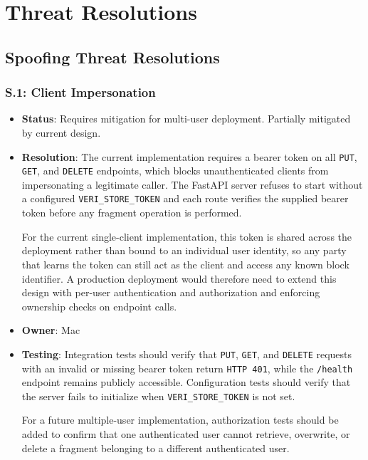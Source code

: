 \documentclass[../veristore_security_model.tex]{subfiles}
\begin{document}
\section{Threat Resolutions}


\subsection{Spoofing Threat Resolutions}

\subsubsection{S.1: Client Impersonation}
\begin{itemize}
    \item \textbf{Status}: Requires mitigation for multi-user deployment. Partially mitigated by current design.
    \item \textbf{Resolution}: The current implementation requires a bearer token on all \texttt{PUT}, \texttt{GET}, and \texttt{DELETE} endpoints, which blocks unauthenticated clients from impersonating a legitimate caller. The FastAPI server refuses to start without a configured \texttt{VERI\_STORE\_TOKEN} and each route verifies the supplied bearer token before any fragment operation is performed.
    
    For the current single-client implementation, this token is shared across the deployment rather than bound to an individual user identity, so any party that learns the token can still act as the client and access any known block identifier. A production deployment would therefore need to extend this design with per-user authentication and authorization and enforcing ownership checks on endpoint calls.
    \item \textbf{Owner}: Mac
    \item \textbf{Testing}: Integration tests should verify that \texttt{PUT}, \texttt{GET}, and \texttt{DELETE} requests with an invalid or missing bearer token return \texttt{HTTP 401}, while the \texttt{/health} endpoint remains publicly accessible. Configuration tests should verify that the server fails to initialize when \texttt{VERI\_STORE\_TOKEN} is not set.
    
    For a future multiple-user implementation, authorization tests should be added to confirm that one authenticated user cannot retrieve, overwrite, or delete a fragment belonging to a different authenticated user.
\end{itemize}
\end{document}
